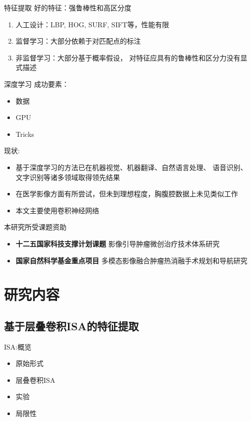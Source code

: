 \documentclass {beamer}
\begin{document}
\begin{frame}{特征提取}
    好的特征：强\alert{鲁棒性}和高\alert{区分度}
    \begin{enumerate}
        \item 人工设计：LBP, HOG, SURF, SIFT等，性能有限
        \item 监督学习：大部分依赖于对匹配点的标注
        \item 非监督学习：大部分基于概率假设，
            对特征应具有的鲁棒性和区分力没有显式描述
    \end{enumerate}
\end{frame}

\begin{frame}{深度学习}
    \noindent
    成功要素：
    \begin{itemize}
        \item 数据
        \item GPU
        \item Tricks
    \end{itemize}
    \pause

    \noindent
    现状:
    \begin{itemize}
        \item 基于深度学习的方法已在机器视觉、机器翻译、自然语言处理、
            语音识别、文字识别等诸多领域取得领先结果
        \item 在医学影像方面有所尝试，但未到理想程度，胸腹腔数据上未见类似工作
        \item 本文主要使用卷积神经网络
    \end{itemize}
\end{frame}

\begin{frame}{本研究所受课题资助}
    \begin{itemize}
        \item {\bf 十二五国家科技支撑计划课题} 影像引导肿瘤微创治疗技术体系研究
        \item {\bf 国家自然科学基金重点项目}
            多模态影像融合肿瘤热消融手术规划和导航研究
    \end{itemize}
\end{frame}


\section{研究内容}
\subsection{基于层叠卷积ISA的特征提取}
\begin{frame}{ISA:概览}
    \begin{itemize}
        \item 原始形式
        \item 层叠卷积ISA
        \item 实验
        \item 局限性
    \end{itemize}
\end{frame}
\end{document}

